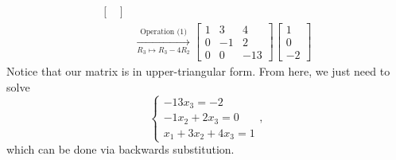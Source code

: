 \documentclass[letterpaper]{article}
\newcommand{\0}{\mathbf{0}}
\begin{document}
\begin{mdframed}
\begin{mdframed}
\begin{equation*}
\begin{aligned}
\begin{bmatrix}
                    \end{bmatrix} \\ 
                    &\xrightarrow[R_3 \mapsto R_3 - 4R_2]{\text{Operation (1)}} \begin{bmatrix}
                        1 & 3 & 4 \\ 
                        0 & -1 & 2 \\ 
                        0 & 0 & -13
                    \end{bmatrix} \begin{bmatrix}
                        1 \\ 0 \\ -2 
                    \end{bmatrix}
            \end{aligned}
        \end{equation*}
        Notice that our matrix is in upper-triangular form. From here, we just need to solve 
        \[\begin{cases}
            -13x_3 = -2 \\ 
            -1x_2 + 2x_3 = 0 \\ 
            x_1 + 3x_2 + 4x_3 = 1
        \end{cases},\]
        which can be done via backwards substitution.

        \bigskip 


\end{mdframed}
\end{mdframed}
\end{document}
